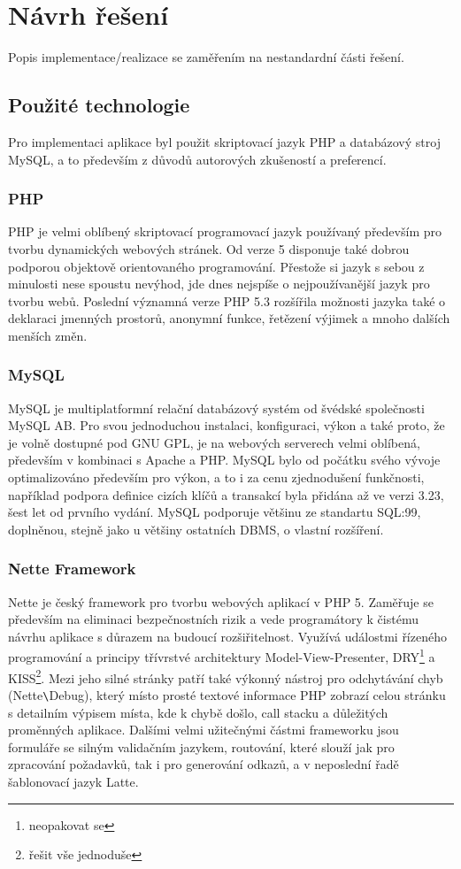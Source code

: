 \documentclass[11pt,twoside,a4paper]{book}
\begin{document}
\chapter{Návrh řešení}
Popis implementace/realizace se zaměřením na nestandardní části řešení.

\section{Použité technologie}
Pro implementaci aplikace byl použit skriptovací jazyk PHP a databázový stroj MySQL, a to především z důvodů autorových zkušeností a preferencí.

\subsection{PHP}
PHP je velmi oblíbený skriptovací programovací jazyk používaný především pro tvorbu dynamických webových stránek. Od verze 5 disponuje také dobrou podporou objektově orientovaného programování. Přestože si jazyk s sebou z minulosti nese spoustu nevýhod, jde dnes nejspíše o nejpoužívanější jazyk pro tvorbu webů. Poslední významná verze PHP 5.3 rozšířila možnosti jazyka také o deklaraci jmenných prostorů, anonymní funkce, řetězení výjimek a mnoho dalších menších změn.

\subsection{MySQL}
MySQL je multiplatformní relační databázový systém od švédské společnosti MySQL AB. Pro svou jednoduchou instalaci, konfiguraci, výkon a také proto, že je volně dostupné pod GNU GPL, je na webových serverech velmi oblíbená, především v kombinaci s Apache a PHP. MySQL bylo od počátku svého vývoje optimalizováno především pro výkon, a to i za cenu zjednodušení funkčnosti, například podpora definice cizích klíčů a transakcí byla přidána až ve verzi 3.23, šest let od prvního vydání. MySQL podporuje většinu ze standartu SQL:99, doplněnou, stejně jako u většiny ostatních DBMS, o vlastní rozšíření.

\subsection{Nette Framework}
Nette je český framework pro tvorbu webových aplikací v PHP 5. Zaměřuje se především na eliminaci bezpečnostních rizik a vede programátory k čistému návrhu aplikace s důrazem na budoucí rozšiřitelnost. Využívá událostmi řízeného programování a principy třívrstvé architektury Model-View-Presenter, DRY\footnote{neopakovat se} a KISS\footnote{řešit vše jednoduše}. Mezi jeho silné stránky patří také výkonný nástroj pro odchytávání chyb (Nette\verb|\|Debug), který místo prosté textové informace PHP zobrazí celou stránku s detailním výpisem místa, kde k chybě došlo, call stacku a důležitých proměnných aplikace. Dalšími velmi užitečnými částmi frameworku jsou formuláře se silným validačním jazykem, routování, které slouží jak pro zpracování požadavků, tak i pro generování odkazů, a v neposlední řadě šablonovací jazyk Latte.
\end{document}
